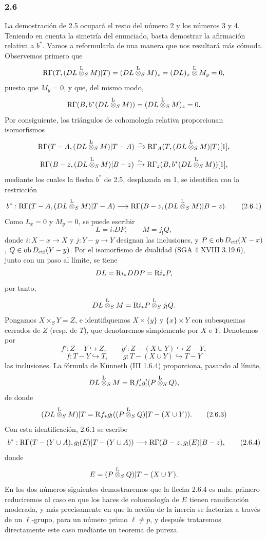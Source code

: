 \subsubsection*{2.6}
La demostración de 2.5 ocupará el resto del número 2 y los números 3 y 4. Teniendo en cuenta la simetría del enunciado, basta demostrar la afirmación relativa a $b^*$. Vamos a reformularla de una manera que nos resultará más cómoda. Observemos primero que
\[
\mathrm{R}\Gamma(T,(DL\overset{\mathrm L}{\otimes}_SM)|T)
 =(DL\overset{\mathrm L}{\otimes}_SM)_z
 =(DL)_x\overset{\mathrm L}{\otimes} M_y=0,
\]
puesto que $M_y=0$, y que, del mismo modo,
\[
\mathrm{R}\Gamma(B,b^*(DL\overset{\mathrm L}{\otimes}_SM))
 =(DL\overset{\mathrm L}{\otimes}_SM)_z=0.
\]
Por consiguiente, los triángulos de cohomología relativa proporcionan isomorfismos
\[
\mathrm{R}\Gamma(T-A,(DL\overset{\mathrm L}{\otimes}_SM)|T-A)
 \xrightarrow{\sim}
\mathrm{R}\Gamma_A(T,(DL\overset{\mathrm L}{\otimes}_SM)|T)[1],
\]
\[
\mathrm{R}\Gamma(B-z,(DL\overset{\mathrm L}{\otimes}_SM)|B-z)
 \xrightarrow{\sim}
\mathrm{R}\Gamma_z(B,b^*(DL\overset{\mathrm L}{\otimes}_SM))[1],
\]
mediante los cuales la flecha $b^*$ de 2.5, desplazada en 1, se identifica con la restricción
\begin{equation}
b^*:\mathrm{R}\Gamma(T-A,(DL\overset{\mathrm L}{\otimes}_SM)|T-A)
 \longrightarrow \mathrm{R}\Gamma(B-z,(DL\overset{\mathrm L}{\otimes}_SM)|B-z).
\tag{2.6.1}
\end{equation}
Como $L_x=0$ y $M_y=0$, se puede escribir
\begin{equation}
L=i_!DP,\qquad M=j_!Q,
\tag{2.6.2}
\end{equation}
donde $i:X-x\to X$ y $j:Y-y\to Y$ designan las inclusiones, y $P\in\operatorname{ob} D_{\mathrm{ctf}}(X-x)$, $Q\in\operatorname{ob} D_{\mathrm{ctf}}(Y-y)$. Por el isomorfismo de dualidad (SGA 4 XVIII 3.19.6), junto con un paso al límite, se tiene
\[
DL=\mathrm{R} i_*DDP=\mathrm{R} i_*P,
\]
por tanto,
\[
DL\overset{\mathrm L}{\otimes}_SM=\mathrm{R} i_*P\overset{\mathrm L}{\otimes}_Sj_!Q.
\]
Pongamos $X\times_SY=Z$, e identifiquemos $X\times\{y\}$ y $\{x\}\times Y$ con subesquemas cerrados de $Z$ (resp. de $T$), que denotaremos simplemente por $X$ e $Y$. Denotemos por
\[
f':Z-Y\hookrightarrow Z,\qquad
g':Z-(X\cup Y)\hookrightarrow Z-Y,
\]
\[
f:T-Y\hookrightarrow T,\qquad
g:T-(X\cup Y)\hookrightarrow T-Y
\]
las inclusiones. La fórmula de Künneth (III 1.6.4) proporciona, pasando al límite,
\[
DL\overset{\mathrm L}{\otimes}_SM=\mathrm{R} f'_*g'_!(P\overset{\mathrm L}{\otimes}_SQ),
\]
de donde
\begin{equation}
(DL\overset{\mathrm L}{\otimes}_SM)|T=\mathrm{R} f_*g_!((P\overset{\mathrm L}{\otimes}_SQ)|T-(X\cup Y)).
\tag{2.6.3}
\end{equation}
Con esta identificación, 2.6.1 se escribe
\begin{equation}
b^*:\mathrm{R}\Gamma(T-(Y\cup A),g_!(E)|T-(Y\cup A))
 \longrightarrow \mathrm{R}\Gamma(B-z,g_!(E)|B-z),
\tag{2.6.4}
\end{equation}
donde
\[
E=(P\overset{\mathrm L}{\otimes}_SQ)|T-(X\cup Y).
\]
En los dos números siguientes demostraremos que la flecha 2.6.4 es nula: primero reduciremos al caso en que los haces de cohomología de $E$ tienen ramificación moderada, y más precisamente en que la acción de la inercia se factoriza a través de un $\ell$-grupo, para un número primo $\ell\ne p$, y después trataremos directamente este caso mediante un teorema de pureza.

